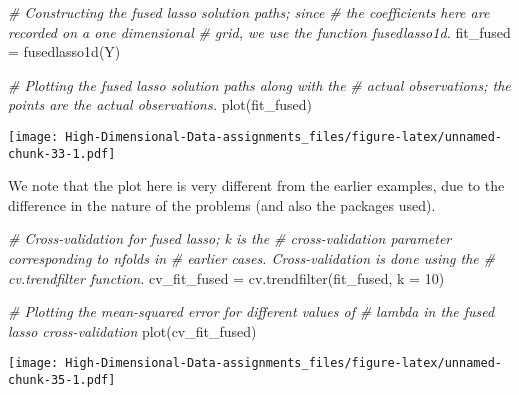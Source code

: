 \documentclass[
]{book}
\newenvironment{Shaded}{\begin{snugshade}}{\end{snugshade}}
\newcommand{\AttributeTok}[1]{\textcolor[rgb]{0.77,0.63,0.00}{#1}}
\newcommand{\CommentTok}[1]{\textcolor[rgb]{0.56,0.35,0.01}{\textit{#1}}}
\newcommand{\DecValTok}[1]{\textcolor[rgb]{0.00,0.00,0.81}{#1}}
\newcommand{\FunctionTok}[1]{\textcolor[rgb]{0.00,0.00,0.00}{#1}}
\newcommand{\NormalTok}[1]{#1}
\newcommand{\OtherTok}[1]{\textcolor[rgb]{0.56,0.35,0.01}{#1}}
\newcommand{\SpecialCharTok}[1]{\textcolor[rgb]{0.00,0.00,0.00}{#1}}
\newcommand{\StringTok}[1]{\textcolor[rgb]{0.31,0.60,0.02}{#1}}
\begin{document}
\begin{Shaded}
\begin{Highlighting}[]
\CommentTok{\# Constructing the fused lasso solution paths; since}
\CommentTok{\# the coefficients here are recorded on a one dimensional}
\CommentTok{\# grid, we use the function \textquotesingle{}fusedlasso1d\textquotesingle{}.}
\NormalTok{fit\_fused }\OtherTok{=} \FunctionTok{fusedlasso1d}\NormalTok{(Y)}

\CommentTok{\# Plotting the fused lasso solution paths along with the}
\CommentTok{\# actual observations; the points are the actual observations.}
\FunctionTok{plot}\NormalTok{(fit\_fused)}
\end{Highlighting}
\end{Shaded}

\texttt{[image: High-Dimensional-Data-assignments\_files/figure-latex/unnamed-chunk-33-1.pdf]}

We note that the plot here is very different from the earlier examples, due to the difference in the nature of the problems (and also the packages used).

\begin{Shaded}
\begin{Highlighting}[]
\CommentTok{\# Cross{-}validation for fused lasso; \textquotesingle{}k\textquotesingle{} is  the}
\CommentTok{\# cross{-}validation parameter corresponding to \textquotesingle{}nfolds\textquotesingle{} in}
\CommentTok{\# earlier cases. Cross{-}validation is done using the}
\CommentTok{\# \textquotesingle{}cv.trendfilter\textquotesingle{} function.}
\NormalTok{cv\_fit\_fused }\OtherTok{=} \FunctionTok{cv.trendfilter}\NormalTok{(fit\_fused, }\AttributeTok{k =} \DecValTok{10}\NormalTok{)}
\end{Highlighting}
\end{Shaded}

\begin{Shaded}
\begin{Highlighting}[]
\CommentTok{\# Plotting the mean{-}squared error for different values of}
\CommentTok{\# lambda in the fused lasso cross{-}validation}
\FunctionTok{plot}\NormalTok{(cv\_fit\_fused)}
\end{Highlighting}
\end{Shaded}

\texttt{[image: High-Dimensional-Data-assignments\_files/figure-latex/unnamed-chunk-35-1.pdf]}

\begin{Shaded}
\end{Shaded}
\end{document}
